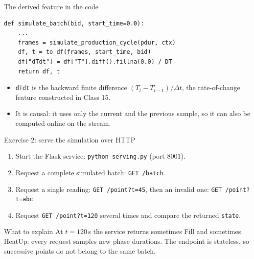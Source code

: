\begin{frame}[fragile]{The derived feature in the code}
\begin{lstlisting}[style=coursepython]
def simulate_batch(bid, start_time=0.0):
    ...
    frames = simulate_production_cycle(pdur, ctx)
    df, t = to_df(frames, start_time, bid)
    df["dTdt"] = df["T"].diff().fillna(0.0) / DT
    return df, t
\end{lstlisting}
\begin{itemize}
\item \texttt{dTdt} is the backward finite difference $(T_t - T_{t-1})/\Delta t$, the rate-of-change feature constructed in Class 15.
\item It is causal: it uses only the current and the previous sample, so it can also be computed online on the stream.
\end{itemize}
\coursefooter
\end{frame}

\begin{frame}{Exercise 2: serve the simulation over HTTP}
\begin{enumerate}
\item Start the Flask service: \texttt{python serving.py} (port 8001).
\item Request a complete simulated batch: \texttt{GET /batch}.
\item Request a single reading: \texttt{GET /point?t=45}, then an invalid one: \texttt{GET /point?t=abc}.
\item Request \texttt{GET /point?t=120} several times and compare the returned \texttt{state}.
\end{enumerate}
\vspace{0.4em}
\begin{block}{What to explain}
At $t = 120$\,s the service returns sometimes Fill and sometimes HeatUp: every request samples new phase durations. The endpoint is stateless, so successive points do not belong to the same batch.
\end{block}
\coursefooter
\end{frame}

